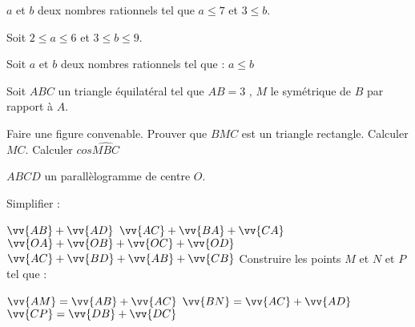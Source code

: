 \documentclass[a4paper,addpoints,12pt]{exam}
\begin{document}
\devoir[sem=2,prv=false,ds=false,num=5 ,niv=2 ,date=17/04/2023,Rdate=24/04/2023]

\begin{exo}
\begin{questions}
\question $a$ et $b$ deux nombres rationnels tel que $a\leq 7$ et $3\leq b$.
\question Soit $2\leq a \leq 6$ et $3\leq b \leq 9$.
\question Soit $a$ et $b$ deux nombres rationnels tel que : $a\leq b$
\end{questions}
\end{exo}

\begin{exo}
Soit $ABC$ un triangle équilatéral tel que $AB=3$ , $M$ le symétrique de $B$ par rapport à $A$.
\begin{questions}
\question Faire une figure convenable.
\question Prouver que $BMC$ est un triangle rectangle.
\question Calculer $MC$.
\question Calculer $cos\widehat{MBC}$
\end{questions}
\end{exo}

\begin{exo}
$ABCD$ un parallèlogramme de centre $O$.
\begin{questions}
\question Simplifier :

$\vv{AB}+\vv{AD}$\hspace{1cm}
$\vv{AC}+\vv{BA}+\vv{CA}$\hspace{1cm}
$\vv{OA}+\vv{OB}+\vv{OC}+\vv{OD}$\hspace{1cm}
$\vv{AC}+\vv{BD}+\vv{AB}+\vv{CB}$
\question Construire les points $M$ et $N$ et $P$ tel que :

$\vv{AM}=\vv{AB}+\vv{AC}$ \hspace{1cm}
$\vv{BN}=\vv{AC}+\vv{AD}$\hspace{1cm}
$\vv{CP}=\vv{DB}+\vv{DC}$
\end{questions}
\end{exo}
\end{document}
